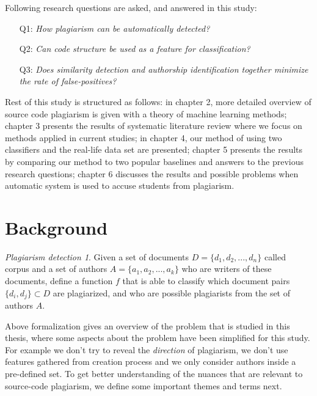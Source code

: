 \documentclass[english, grading]{tktltiki2}
\theoremstyle{definition}
\theoremstyle{remark}
\numberwithin{equation}{section} %
\begin{document}
Following research questions are asked, and answered in this study:

\begin{itemize}
    \item[Q1:] \emph{How plagiarism can be automatically detected?}
    \item[Q2:] \emph{Can code structure be used as a feature for classification?}
    \item[Q3:] \emph{Does similarity detection and authorship identification together minimize the rate of false-positives?}
\end{itemize}

Rest of this study is structured as follows: in chapter 2, more detailed overview of source code plagiarism is given with a theory of machine learning methods; chapter 3 presents the results of systematic literature review where we focus on methods applied in current studies; in chapter 4, our method of using two classifiers and the real-life data set are presented; chapter 5 presents the results by comparing our method to two popular baselines and answers to the previous research questions; chapter 6 discusses the results and possible problems when automatic system is used to accuse students from plagiarism. 

\section{Background}

\newtheorem*{sc-plg}{Plagiarism detection}
\begin{sc-plg}
Given a set of documents $D = \{d_1, d_2, ..., d_n\}$ called corpus and a set of authors $A = \{a_1, a_2, ..., a_k\}$ who are writers of these documents, define a function $f$ that is able to classify which document pairs $\{d_i, d_j\} \subset D$ are plagiarized, and who are possible plagiarists from the set of authors $A$.
\end{sc-plg}

Above formalization gives an overview of the problem that is studied in this thesis, where some aspects about the problem have been simplified for this study. For example we don't try to reveal the \emph{direction} of plagiarism, we don't use features gathered from creation process and we only consider authors inside a pre-defined set. To get better understanding of the nuances that are relevant to source-code plagiarism, we define some important themes and terms next.


\end{document}
